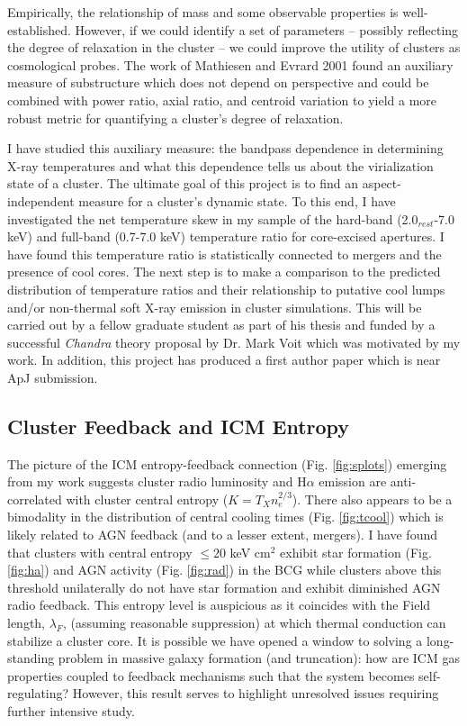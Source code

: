 \documentclass[11pt]{article}
\begin{document}
Empirically, the relationship of mass and some observable properties
is well-established. However, if we could identify a set of parameters
-- possibly reflecting the degree of relaxation in the cluster -- we
could improve the utility of clusters as cosmological probes. The work
of Mathiesen and Evrard 2001 found an auxiliary measure of substructure
which does not depend on perspective and could be combined with power
ratio, axial ratio, and centroid variation to yield a more robust
metric for quantifying a cluster's degree of relaxation.

I have studied this auxiliary measure: the bandpass dependence in
determining X-ray temperatures and what this dependence tells us about
the virialization state of a cluster. The ultimate goal of this
project is to find an aspect-independent measure for a cluster's
dynamic state. To this end, I have investigated the net temperature skew in my
sample of the hard-band (2.0$_{rest}$-7.0 keV) and full-band (0.7-7.0
keV) temperature ratio for core-excised apertures. I have found this
temperature ratio is statistically connected to mergers and the
presence of cool cores. The next step is to make a comparison to
the predicted distribution of temperature ratios and their
relationship to putative cool lumps and/or non-thermal soft X-ray
emission in cluster simulations. This will be carried out by a fellow
graduate student as part of his thesis and funded by a successful
{\textit{Chandra}} theory proposal by Dr. Mark Voit which was
motivated by my work. In addition, this project has produced a first
author paper which is near ApJ submission.

\subsection*{Cluster Feedback and ICM Entropy}

The picture of the ICM entropy-feedback connection
(Fig. \ref{fig:splots}) emerging from my work suggests cluster radio
luminosity and H$\alpha$ emission are anti-correlated with cluster
central entropy ($K=T_Xn_e^{2/3}$). There also appears to be a
bimodality in the distribution of central cooling times
(Fig. \ref{fig:tcool}) which is likely related to AGN feedback (and to
a lesser extent, mergers). I have found that clusters with central
entropy $\leq 20$ keV cm$^2$ exhibit star formation
(Fig. \ref{fig:ha}) and AGN activity (Fig. \ref{fig:rad}) in the BCG
while clusters above this threshold unilaterally do not have star formation
and exhibit diminished AGN radio feedback. This entropy level is
auspicious as it coincides with the Field length, $\lambda_F$,
(assuming reasonable suppression) at which thermal conduction can
stabilize a cluster core. It is possible we have opened a window to
solving a long-standing problem in massive galaxy formation (and
truncation): how are ICM gas properties coupled to feedback mechanisms
such that the system becomes self-regulating? However, this result
serves to highlight unresolved issues requiring further intensive
study.\\
\end{document}
